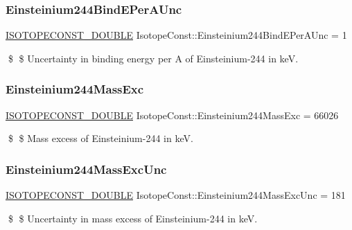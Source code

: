 \subsubsection{\texorpdfstring{Einsteinium244\+Bind\+E\+Per\+A\+Unc}{Einsteinium244BindEPerAUnc}}
{\footnotesize\ttfamily \mbox{\hyperlink{group___isotope_const-_macros_ga8f45a7272ce02c0b4c65c44636ed719a}{I\+S\+O\+T\+O\+P\+E\+C\+O\+N\+S\+T\+\_\+\+D\+O\+U\+B\+LE}} Isotope\+Const\+::\+Einsteinium244\+Bind\+E\+Per\+A\+Unc = 1}

\$ \$ Uncertainty in binding energy per A of Einsteinium-\/244 in keV. \mbox{\label{group___isotope_const-_einsteinium-_es244_ga66e059eb852c87897fd5587051786c9e}} 
\subsubsection{\texorpdfstring{Einsteinium244\+Mass\+Exc}{Einsteinium244MassExc}}
{\footnotesize\ttfamily \mbox{\hyperlink{group___isotope_const-_macros_ga8f45a7272ce02c0b4c65c44636ed719a}{I\+S\+O\+T\+O\+P\+E\+C\+O\+N\+S\+T\+\_\+\+D\+O\+U\+B\+LE}} Isotope\+Const\+::\+Einsteinium244\+Mass\+Exc = 66026}

\$ \$ Mass excess of Einsteinium-\/244 in keV. \mbox{\label{group___isotope_const-_einsteinium-_es244_ga3c29f4a61322b8ae9708799c670fb4f4}} 
\subsubsection{\texorpdfstring{Einsteinium244\+Mass\+Exc\+Unc}{Einsteinium244MassExcUnc}}
{\footnotesize\ttfamily \mbox{\hyperlink{group___isotope_const-_macros_ga8f45a7272ce02c0b4c65c44636ed719a}{I\+S\+O\+T\+O\+P\+E\+C\+O\+N\+S\+T\+\_\+\+D\+O\+U\+B\+LE}} Isotope\+Const\+::\+Einsteinium244\+Mass\+Exc\+Unc = 181}

\$ \$ Uncertainty in mass excess of Einsteinium-\/244 in keV. \mbox{\label{group___isotope_const-_einsteinium-_es244_ga3790a8dd1a3bf54b241bbc329f6ec941}} 
